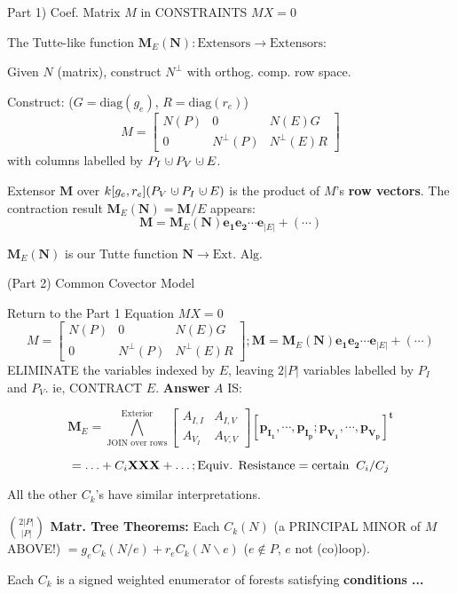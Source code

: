 \documentclass{article}
\newcommand{\dunion}
{\mbox{\hbox{\hskip0.45em$\cdot$\hskip-0.44em$\cup$\hskip0.2em}}}
\begin{document}
\begin{frame}
{Part 1) Coef. Matrix $M$ in CONSTRAINTS $MX=0$}
\begin{center}
The Tutte-like function $\mathbf{M}_E(\mathbf{N}):\text{Extensors}\rightarrow\text{Extensors}$:
\end{center}

Given $N$ (matrix), construct $N^\perp$ 
with orthog. comp. row space.

Construct:  ($G=\mbox{diag}(g_e)$, $R=\mbox{diag}(r_e)$)
\[
M = \left[\begin{array}{c|c|c} N(P)  &  0  &  N(E)G \\  \hline
0  & N^{\perp}(P)  &  N^{\perp}(E)R \end{array}\right]
\]
with columns labelled by $P_I\dunion P_V\dunion E$.

Extensor $\mathbf{M}$ over $k[g_e, r_e](P_V\dunion P_I \dunion E)$
is the product of $M$'s \textbf{row vectors}. The contraction result
$\mathbf{M}_E(\mathbf{N}) = \mathbf{M}/E$ appears:
\[
\mathbf{M} = \mathbf{M}_E(\mathbf{N})\mathbf{e_1}\mathbf{e_2}\cdots\mathbf{e}_{|E|} + (\cdots) 
\]

$\mathbf{M}_E(\mathbf{N})$ is our Tutte function $\mathbf{N}\rightarrow \text{Ext. Alg.}$
\end{frame}

\begin{frame}{(Part 2) Common Covector Model}

\end{frame}

\begin{frame}{Return to the Part 1 Equation $MX=0$}
\[
M = \left[\begin{array}{c|c|c} N(P)  &  0  &  N(E)G \\  \hline
0  & N^{\perp}(P)  &  N^{\perp}(E)R \end{array}\right]
;
\mathbf{M} = \mathbf{M}_E(\mathbf{N})\mathbf{e_1}\mathbf{e_2}\cdots\mathbf{e}_{|E|} + (\cdots) 
\]
ELIMINATE the variables indexed by $E$, leaving $2|P|$ variables
labelled by $P_I$ and $P_V$.  ie, CONTRACT $E$. \textbf{Answer} $A$ IS:

\[
\mathbf{M}_E = \bigwedge^{\text{Exterior}}_{\text{JOIN over rows}} \left[\begin{array}{c|c} A_{I,I}  &  A_{I,V}   \\  \hline
    A_{V_I}  & A_{V,V} \end{array}\right] 
[\mathbf{p_{I_1}, \cdots, p_{I_p}; p_{V_1}, \cdots, p_{V_p}}]^{\mathbf{t}} 
\]

\[
 = \ldots + C_i\mbox{\bf XXX} + \ldots; \text{Equiv. Resistance} = 
\text{certain}\;\; C_i/C_j
\]

All the other $C_k$'s have similar interpretations.

{\bf $\binom{2|P|}{|P|}$ Matr. Tree Theorems:}
Each $C_k(N)$ (a PRINCIPAL MINOR of $M$ ABOVE!)
$= 
g_e C_k(N/e) + r_e C_k(N\backslash e)$ ($e\not\in P$, $e$ not (co)loop).

Each $C_k$ is a signed weighted enumerator of
forests satisfying \textbf{conditions ...}
\end{frame}
\end{document}
